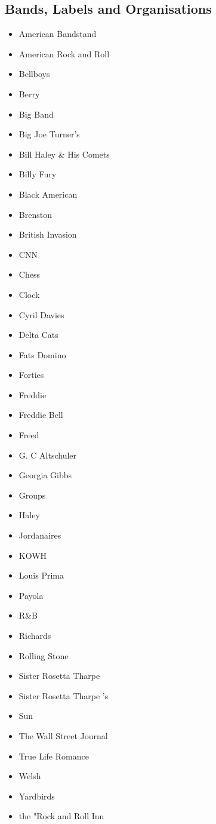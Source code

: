 \documentclass[12pt,a4paper]{article}
\begin{document}
\subsection{Bands, Labels and Organisations}
\begin{itemize}
  \item American Bandstand
  \item American Rock and Roll
  \item Bellboys
  \item Berry
  \item Big Band
  \item Big Joe Turner's
  \item Bill Haley \& His Comets
  \item Billy Fury
  \item Black American
  \item Brenston
  \item British Invasion
  \item CNN
  \item Chess
  \item Clock
  \item Cyril Davies
  \item Delta Cats
  \item Fats Domino
  \item Forties
  \item Freddie
  \item Freddie Bell
  \item Freed
  \item G. C Altschuler
  \item Georgia Gibbs
  \item Groups
  \item Haley
  \item Jordanaires
  \item KOWH
  \item Louis Prima
  \item Payola
  \item R\&B
  \item Richards
  \item Rolling Stone
  \item Sister Rosetta Tharpe
  \item Sister Rosetta Tharpe 's
  \item Sun
  \item The Wall Street Journal
  \item True Life Romance
  \item Welsh
  \item Yardbirds
  \item the "Rock and Roll Inn

\end{itemize}
\end{document}
